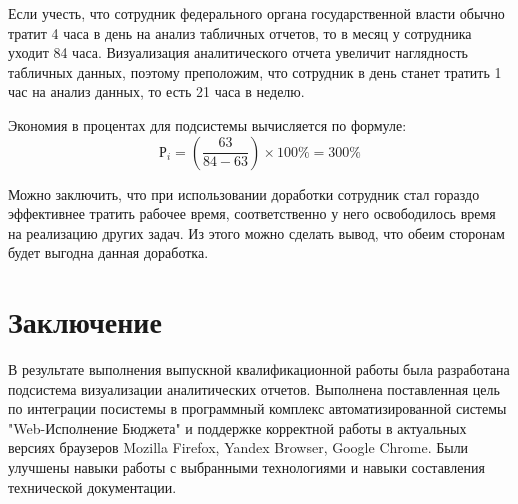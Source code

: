 \documentclass[a4paper]{extarticle}
\numberwithin{equation}{section}
\begin{document}
Если учесть, что сотрудник федерального органа государственной власти обычно тратит 4 часа в день на анализ табличных отчетов, то в месяц у сотрудника уходит 84 часа. Визуализация аналитического отчета увеличит наглядность табличных данных, поэтому преположим, что сотрудник в день станет тратить 1 час на анализ данных, то есть 21 часа в неделю.\par
Экономия в процентах для подсистемы вычисляется по формуле:
\begin{equation}
\label{form22}
	\text{Р}_i=(\frac{63}{84-63})\times 100\%=300\%
\end{equation}\par
Можно заключить, что при использовании доработки сотрудник стал гораздо эффективнее тратить рабочее время, соответственно у него освободилось время на реализацию других задач. Из этого можно сделать вывод, что обеим сторонам будет выгодна данная доработка.

\newpage
\section*{Заключение}
В результате выполнения выпускной квалификационной работы была разработана подсистема визуализации аналитических отчетов. Выполнена поставленная цель по интеграции посистемы в программный комплекс автоматизированной системы "Web-Исполнение Бюджета" и поддержке корректной работы в актуальных версиях браузеров Mozilla Firefox, Yandex Browser, Google Chrome. Были улучшены навыки работы с выбранными технологиями и навыки составления технической документации.

\newpage
\end{document}
